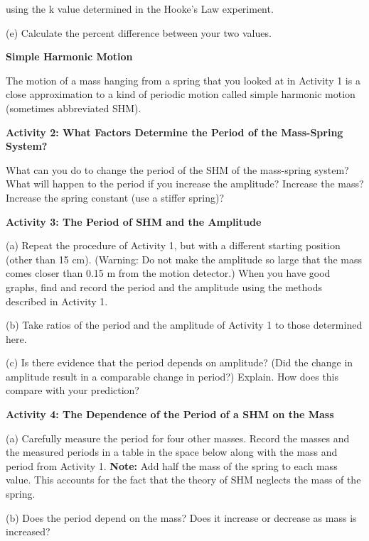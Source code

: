 using the k value determined in the Hooke's Law experiment.
\vspace{15mm}

(e) Calculate the percent difference between your two values.


\newpage

\textbf{Simple Harmonic Motion }

The motion of a mass hanging from a spring that you looked at in Activity 1
is a close approximation to a kind of periodic motion called simple harmonic
motion (sometimes abbreviated SHM).

\textbf{Activity 2: What Factors Determine the Period of the Mass-Spring System? }

What can you do to change the period of the SHM of the mass-spring system? What
will happen to the period if you increase the amplitude? Increase the mass?
Increase the spring constant (use a stiffer spring)?
\vspace{30mm}

\textbf{Activity 3: The Period of SHM and the Amplitude} 

(a) Repeat the procedure of Activity 1, but with a different starting position
(other than 15 cm). (Warning: Do not make the amplitude so large that the mass
comes closer than 0.15 m from the motion detector.) When you have good graphs,
find and record the period and the amplitude using the methods described in
Activity 1. 
\vspace{20mm}

(b) Take ratios of the period and the amplitude of Activity 1 to those determined
here.
\vspace{20mm}

(c) Is there evidence that the period depends on amplitude? (Did the change
in amplitude result in a comparable change in period?) Explain. How does this
compare with your prediction?
\vspace{20mm}

\textbf{Activity 4: The Dependence of the Period of a SHM on the Mass} 

(a) Carefully measure the period for four other masses. Record the masses and
the measured periods in a table in the space below along with the mass and 
period from Activity 1. \textbf{Note:} Add half the mass of the spring to each 
mass value. This accounts for the fact that the theory of SHM neglects the 
mass of the spring.
\vspace{30mm}

(b) Does the period depend on the mass? Does it increase or decrease as mass
is increased?
\vspace{20mm}

